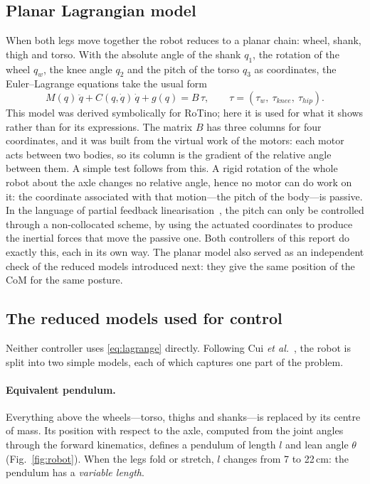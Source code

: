 \documentclass[11pt,a4paper]{article}
\begin{document}
\subsection{Planar Lagrangian model}

When both legs move together the robot reduces to a planar chain: wheel, shank, thigh and torso. With the absolute
angle of the shank $q_1$, the rotation of the wheel $q_w$, the knee angle $q_2$ and the pitch of the torso $q_3$ as
coordinates, the Euler--Lagrange equations take the usual form
\begin{equation}
  M(q)\,\ddot q+C(q,\dot q)\,\dot q+g(q)=B\,\tau,\qquad \tau=(\tau_w,\ \tau_{knee},\ \tau_{hip}).
  \label{eq:lagrange}
\end{equation}
This model was derived symbolically for RoTino; here it is used for what it shows rather than for its expressions.
The matrix $B$ has three columns for four coordinates, and it was built from the virtual work of the motors: each
motor acts between two bodies, so its column is the gradient of the relative angle between them. A simple test
follows from this. A rigid rotation of the whole robot about the axle changes no relative angle, hence no motor
can do work on it: the coordinate associated with that motion---the pitch of the body---is passive. In the language
of partial feedback linearisation~\cite{spong1994}, the pitch can only be controlled through a non-collocated
scheme, by using the actuated coordinates to produce the inertial forces that move the passive one. Both controllers
of this report do exactly this, each in its own way. The planar model also served as an independent check of the
reduced models introduced next: they give the same position of the CoM for the same posture.

\subsection{The reduced models used for control}
\label{sec:reduced}

Neither controller uses \eqref{eq:lagrange} directly. Following Cui \emph{et al.}~\cite{cui2022}, the robot is
split into two simple models, each of which captures one part of the problem.

\paragraph{Equivalent pendulum.} Everything above the wheels---torso, thighs and shanks---is replaced by its
centre of mass. Its position with respect to the axle, computed from the joint angles through the
forward kinematics, defines a pendulum of length $l$ and lean angle $\theta$ (Fig.~\ref{fig:robot}). When the legs
fold or stretch, $l$ changes from 7 to 22\,cm: the pendulum has a \emph{variable length}.
\end{document}
